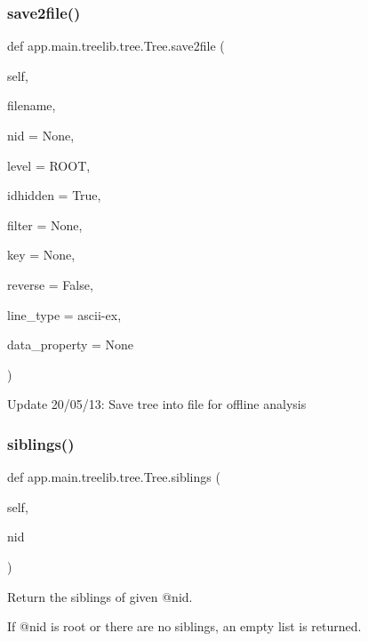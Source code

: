 \subsubsection{\texorpdfstring{save2file()}{save2file()}}
{\footnotesize\ttfamily def app.\+main.\+treelib.\+tree.\+Tree.\+save2file (\begin{DoxyParamCaption}\item[{}]{self,  }\item[{}]{filename,  }\item[{}]{nid = {\ttfamily None},  }\item[{}]{level = {\ttfamily ROOT},  }\item[{}]{idhidden = {\ttfamily True},  }\item[{}]{filter = {\ttfamily None},  }\item[{}]{key = {\ttfamily None},  }\item[{}]{reverse = {\ttfamily False},  }\item[{}]{line\+\_\+type = {\ttfamily \textquotesingle{}ascii-\/ex\textquotesingle{}},  }\item[{}]{data\+\_\+property = {\ttfamily None} }\end{DoxyParamCaption})}

\begin{DoxyVerb}Update 20/05/13: Save tree into file for offline analysis\end{DoxyVerb}
 \mbox{\label{classapp_1_1main_1_1treelib_1_1tree_1_1Tree_ad1ec030b369120a15221ee5b5b1b52e7}} 
\subsubsection{\texorpdfstring{siblings()}{siblings()}}
{\footnotesize\ttfamily def app.\+main.\+treelib.\+tree.\+Tree.\+siblings (\begin{DoxyParamCaption}\item[{}]{self,  }\item[{}]{nid }\end{DoxyParamCaption})}

\begin{DoxyVerb}Return the siblings of given @nid.

If @nid is root or there are no siblings, an empty list is returned.
\end{DoxyVerb}
 \mbox{\label{classapp_1_1main_1_1treelib_1_1tree_1_1Tree_ab647e277f063d1ad6ec236264d2a198f}} 
